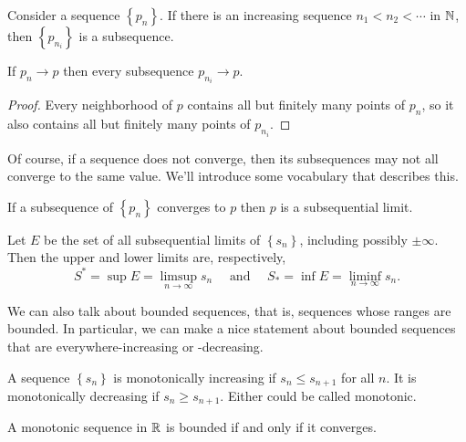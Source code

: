 \documentclass[../m131main.tex]{subfiles}
\begin{document}
\begin{definition}[Subsequence]
    Consider a sequence $\left\{ p_n \right\}$.
    If there is an increasing sequence $n_1 < n_2 < \cdots$ in $\mathbb{N}$, then $\left\{ p_{n_i} \right\}$ is a subsequence.
\end{definition}

\begin{theorem}
    If $p_n \to p$ then every subsequence $p_{n_i} \to p$.
\end{theorem}

\begin{proof}
    Every neighborhood of $p$ contains all but finitely many points of $p_n$, so it also contains all but finitely many points of $p_{n_i}$.
\end{proof}

Of course, if a sequence does not converge, then its subsequences may not all converge to the same value.
We'll introduce some vocabulary that describes this.

\begin{definition}
    If a subsequence of $\left\{ p_n \right\}$ converges to $p$ then $p$ is a subsequential limit.
\end{definition}

\begin{definition}
    Let $E$ be the set of all subsequential limits of $\left\{ s_n \right\}$, including possibly $\pm \infty$.
    Then the upper and lower limits are, respectively,
    \[ S^* = \sup E = \limsup_{n \to \infty} s_n \quad\text{ and }\quad S_* = \inf E = \liminf_{n \to \infty} s_n. \]
\end{definition}

We can also talk about bounded sequences, that is, sequences whose ranges are bounded.
In particular, we can make a nice statement about bounded sequences that are everywhere-increasing or -decreasing.

\begin{definition}
    A sequence $\left\{ s_n \right\}$ is monotonically increasing if $s_n \leq s_{n+1}$ for all $n$.
    It is monotonically decreasing if $s_n \geq s_{n+1}$.
    Either could be called monotonic.
\end{definition}

\begin{theorem}[]
    A monotonic sequence in $\mathbb{R}$ is bounded if and only if it converges.
\end{theorem}
\end{document}
